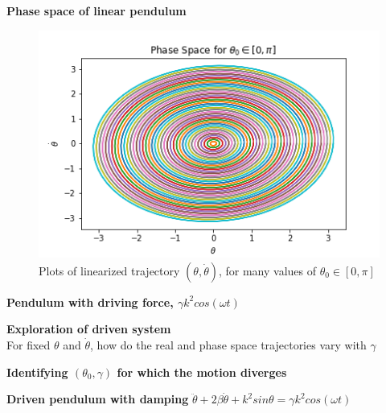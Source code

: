 \documentclass[12pt]{article}
\newenvironment{problem}[2][]{\begin{trivlist}
\item[\hskip \labelsep {\bfseries #1}\hskip \labelsep {\bfseries #2.}]}{\end{trivlist}}
\begin{document}
\begin{problem}{2}
	\textbf{Phase space of linear pendulum}
\begin{figure}[h!]
\centering
  \includegraphics[scale=0.6]{../figures/phaseSpaceLinear.png}
  \caption{Plots of linearized trajectory $(\theta,\dot{\theta})$, for many values of $\theta_{0} \in [0,\pi]$}
  \label{phaseLin}
\end{figure}
\end{problem}

\begin{problem}{3}
	\textbf{Pendulum with driving force, $\gamma k^{2}cos(\omega t)$}
\end{problem}

\begin{problem}{4}
	\textbf{Exploration of driven system} \\
	For fixed $\theta$ and $\dot{\theta}$, how do the real and phase space trajectories vary with $\gamma$
\end{problem}

\begin{problem}{5}
	\textbf{Identifying $(\theta_{0},\gamma)$ for which the motion diverges}
\end{problem}

\begin{problem}{6}
	\textbf{Driven pendulum with damping} $\ddot{\theta}+2\beta\dot{\theta}+k^{2}sin\theta=\gamma k^{2}cos(\omega t)$ \\

\end{problem}

\begin{problem}{7}
\end{problem}
\end{document}
